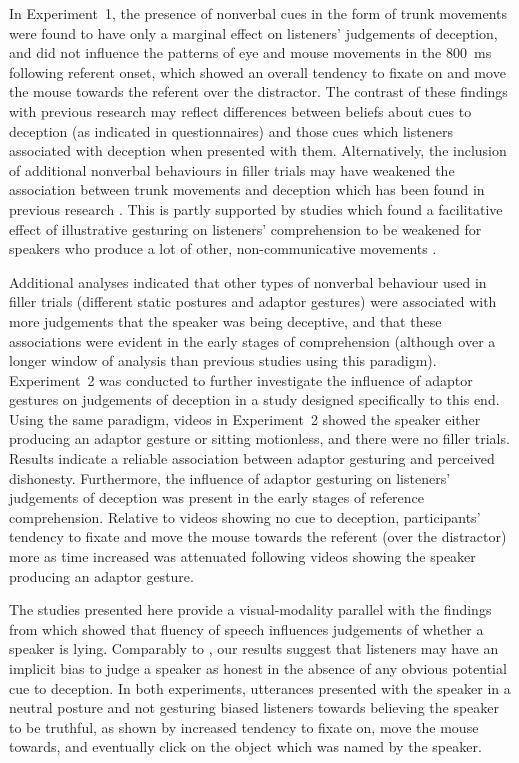 \documentclass[a4paper,man,natbib]{apa6}
\begin{document}
In Experiment~1, the presence of nonverbal cues in the form of trunk movements were found to have only a marginal effect on listeners' judgements of deception, and did not influence the patterns of eye  and mouse movements in the 800~ms following referent onset, which showed an overall tendency to fixate on and move the mouse towards the referent over the distractor.
The contrast of these findings with previous research \citep[e.g.][]{Vrij1996a} may reflect differences between beliefs about cues to deception (as indicated in questionnaires) and those cues which listeners associated with deception when presented with them.
Alternatively, the inclusion of additional nonverbal behaviours in filler trials may have weakened the association between trunk movements and deception which has been found in previous research \citep[e.g][]{Vrij1996a, Zuckerman1981}.
This is partly supported by studies which found a facilitative effect of illustrative gesturing on listeners' comprehension to be weakened for speakers who produce a lot of other, non-communicative movements \citep{Holle2007}. 

Additional analyses indicated that other types of nonverbal behaviour used in filler trials (different static postures and adaptor gestures) were associated with more judgements that the speaker was being deceptive, and that these associations were evident in the early stages of comprehension (although over a longer window of analysis than previous studies using this paradigm).
Experiment~2 was conducted to further investigate the influence of adaptor gestures on judgements of deception in a study designed specifically to this end.
Using the same paradigm, videos in Experiment~2 showed the speaker either producing an adaptor gesture or sitting motionless, and there were no filler trials. 
Results indicate a reliable association between adaptor gesturing and perceived dishonesty.
Furthermore, the influence of adaptor gesturing on listeners' judgements of deception was present in the early stages of reference comprehension.
Relative to videos showing no cue to deception, participants' tendency to fixate and move the mouse towards the referent (over the distractor) more as time increased was attenuated following videos showing the speaker producing an adaptor gesture.

The studies presented here provide a visual-modality parallel with the findings from \citet{Loy2017} which showed that fluency of speech influences judgements of whether a speaker is lying.
Comparably to \citet{Loy2017}, our results suggest that listeners may have an implicit bias to judge a speaker as honest in the absence of any obvious potential cue to deception.
In both experiments, utterances presented with the speaker in a neutral posture and not gesturing biased listeners towards believing the speaker to be truthful, as shown by increased tendency to fixate on, move the mouse towards, and eventually click on the object which was named by the speaker. 
\end{document}

